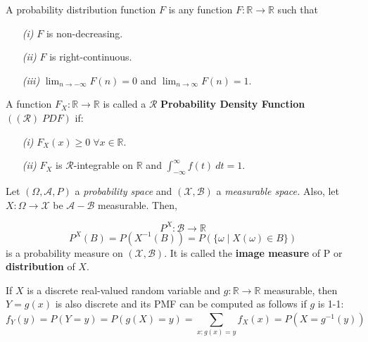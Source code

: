 \documentclass{tufte-handout}
\begin{document}
\begin{definition}
  A probability distribution function $F$ is any function $F: \mathbb{R} \to \mathbb{R}$ such that
  \begin{enumerate}
    \item[\it (i)] $F$ is non-decreasing. 
    \item[\it (ii)] $F$ is right-continuous. 
    \item[\it (iii)] $\lim_{n \to -\infty} F(n) = 0$ and $\lim_{n \to \infty} F(n) = 1.$ 
  \end{enumerate}
\end{definition}
\begin{definition}
  A function $F_X: \mathbb{R}\to \mathbb{R}$ is called a $\mathcal{R}$ \textbf{Probability Density Function} $((\mathcal{R})\;PDF)$ if: 
  \begin{enumerate}
    \item[\it (i)] $F_X(x) \geq 0 \; \forall x \in \mathbb{R}$. 
    \item[\it (ii)] $F_X$ is $\mathcal{R}$-integrable on $\mathbb{R}$ and $\int_{{-\infty}}^{{\infty}} {f(t)} \: d{t} {=1.}$ 

  \end{enumerate}
\end{definition}
\begin{definition}[Distribution of a RV]
  Let $(\Omega, \mathcal{A}, P)$ a \textit{probability space} and $(\mathcal{X, B} )$ a \textit{measurable space.} Also, let $X: \Omega \to \mathcal{X}$ be $\mathcal{A}-\mathcal{B}$ measurable. Then, 

  $$P^X: \mathcal{B}\to \mathbb{R}$$$$  P^X(B) =P(X^{-1}(B)) = P(\{ \omega \mid X (\omega) \in B \})$$
  is a probability measure on $( \mathcal{X,B})$. It is called the \textbf{image measure} of P or
  \textbf{distribution} of $X$.
\end{definition}
\begin{remark} 
 If $X$ is a discrete real-valued random variable and $g: \mathbb{R} \to \mathbb{R}$ measurable, then $Y = g(x)$ is also discrete and its PMF can be computed as follows if $g$ is 1-1: 
  $$f_Y (y) = P (Y = y) = P(g(X) = y ) = \sum^{}_{x: g(x) = y} f_X(x) = P(X= g^{-1} (y)) $$

\end{remark}
\end{document}
